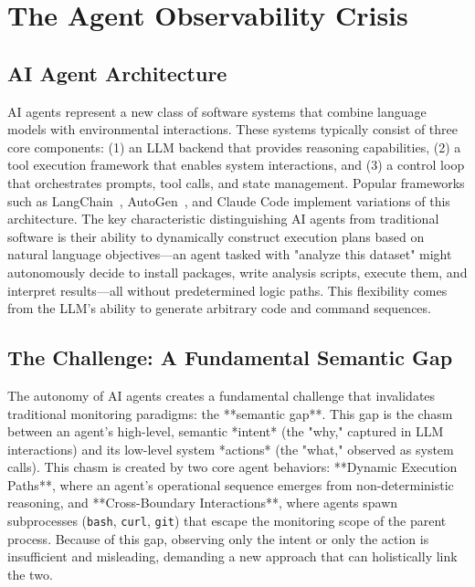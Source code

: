 \section{The Agent Observability Crisis}

\subsection{AI Agent Architecture}
AI agents represent a new class of software systems that combine language models with environmental interactions. These systems typically consist of three core components: (1) an LLM backend that provides reasoning capabilities, (2) a tool execution framework that enables system interactions, and (3) a control loop that orchestrates prompts, tool calls, and state management. Popular frameworks such as LangChain~\cite{langchain}, AutoGen~\cite{autogen}, and Claude Code implement variations of this architecture. The key characteristic distinguishing AI agents from traditional software is their ability to dynamically construct execution plans based on natural language objectives—an agent tasked with "analyze this dataset" might autonomously decide to install packages, write analysis scripts, execute them, and interpret results—all without predetermined logic paths. This flexibility comes from the LLM's ability to generate arbitrary code and command sequences.

\subsection{The Challenge: A Fundamental Semantic Gap}
The autonomy of AI agents creates a fundamental challenge that invalidates traditional monitoring paradigms: the **semantic gap**. This gap is the chasm between an agent's high-level, semantic *intent* (the "why," captured in LLM interactions) and its low-level system *actions* (the "what," observed as system calls). This chasm is created by two core agent behaviors: **Dynamic Execution Paths**, where an agent's operational sequence emerges from non-deterministic reasoning, and **Cross-Boundary Interactions**, where agents spawn subprocesses (\texttt{bash}, \texttt{curl}, \texttt{git}) that escape the monitoring scope of the parent process. Because of this gap, observing only the intent or only the action is insufficient and misleading, demanding a new approach that can holistically link the two.

